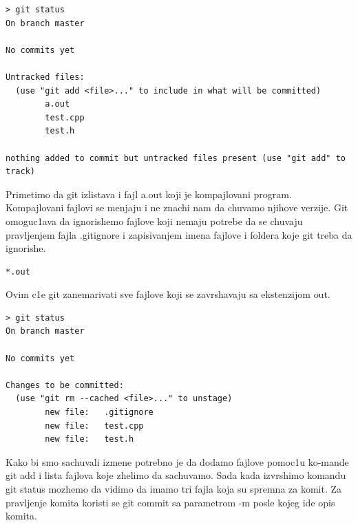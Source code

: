 \documentclass[a4paper,fleqn,12pt]{JMThesis}
\newcommand{\latin}{\fontencoding{T1}\selectfont}
\theoremstyle{plain}
\theoremstyle{definition}
\newcounter{cpp}
\begin{document}
{\latin
\begin{center}
\begin{lstlisting}[caption={\latin git status}]
> git status
On branch master

No commits yet

Untracked files:
  (use "git add <file>..." to include in what will be committed)
        a.out
        test.cpp
        test.h

nothing added to commit but untracked files present (use "git add" to track)
\end{lstlisting}
\end{center}
}
Primetimo da git izlistava i fajl {\latin a.out} koji je kompajlovani program. 
Kompajlovani fajlovi se menjaju i ne znachi nam da chuvamo njihove verzije.
Git omoguc1ava da ignorishemo fajlove koji nemaju potrebe da se chuvaju pravljenjem fajla {\latin .gitignore} i zapisivanjem imena fajlove i foldera koje git treba da ignorishe.

{\latin
\begin{center}
\begin{lstlisting}[caption={\latin .gitignore}]
*.out
\end{lstlisting}
\end{center}
}
Ovim c1e git zanemarivati sve fajlove koji se zavrshavaju sa ekstenzijom {\latin out}.


{\latin
\begin{center}
\begin{lstlisting}[caption={\latin git status}]
> git status
On branch master

No commits yet

Changes to be committed:
  (use "git rm --cached <file>..." to unstage)
        new file:   .gitignore
        new file:   test.cpp
        new file:   test.h
\end{lstlisting}
\end{center}
}

Kako bi smo sachuvali izmene potrebno je da dodamo fajlove pomoc1u ko-mande {\latin git add} i lista fajlova koje zhelimo da sachuvamo. 
Sada kada izvrshimo komandu {\latin git status} mozhemo da vidimo da imamo tri fajla koja su spremna za komit.
Za pravljenje komita koristi se {\latin git commit} sa parametrom {\latin -m} posle kojeg ide opis komita.
\end{document}
